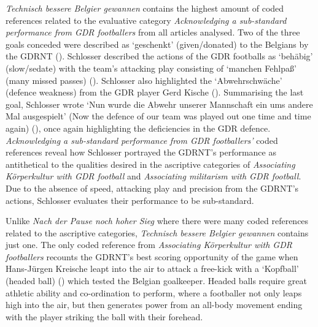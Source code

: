 \textit{Technisch bessere Belgier gewannen} contains the highest amount of coded references related to the evaluative category \textit{Acknowledging a sub-standard performance from GDR footballers} from all articles analysed. Two of the three goals conceded were described as ‘geschenkt’ (given/donated) to the Belgians by the GDRNT (\cite{nd19730419}). Schlosser described the actions of the GDR footballs as ‘behäbig’ (slow/sedate) with the team’s attacking play consisting of ‘manchen Fehlpaß’ (many missed passes) (\cite{nd19730419}). Schlosser also highlighted the ‘Abwehrschwäche’ (defence weakness) from the GDR player Gerd Kische (\cite{nd19730419}). Summarising the last goal, Schlosser wrote ‘Nun wurde die Abwehr unserer Mannschaft ein ums andere Mal ausgespielt’ (Now the defence of our team was played out one time and time again) (\cite{nd19730419}), once again highlighting the deficiencies in the GDR defence. \textit{Acknowledging a sub-standard performance from GDR footballers’} coded references reveal how Schlosser portrayed the GDRNT’s performance as antithetical to the qualities desired in the ascriptive categories of \textit{Associating Körperkultur with GDR football} and \textit{Associating militarism with GDR football}. Due to the absence of speed, attacking play and precision from the GDRNT’s actions, Schlosser evaluates their performance to be sub-standard.

Unlike \textit{Nach der Pause noch hoher Sieg} where there were many coded references related to the ascriptive categories, \textit{Technisch bessere Belgier gewannen} contains just one. The only coded reference from \textit{Associating Körperkultur with GDR footballers} recounts the GDRNT’s best scoring opportunity of the game when Hans-Jürgen Kreische leapt into the air to attack a free-kick with a ‘Kopfball’ (headed ball) (\cite{nd19730419}) which tested the Belgian goalkeeper. Headed balls require great athletic ability and co-ordination to perform, where a footballer not only leaps high into the air, but then generates power from an all-body movement ending with the player striking the ball with their forehead.

